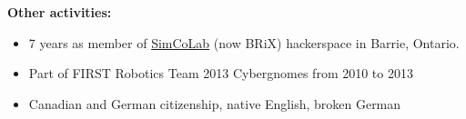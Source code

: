 \documentclass[fleqn,11pt]{article}
\newcommand{\itemoptions}{\setlength{\itemindent}{-10pt} \setlength\itemsep{-1em}}
\begin{document}


%
\begin{tcolorbox}
	\textbf{Other activities:\\}
	\begin{itemize}\itemoptions
	\item 7 years as member of \href{https://www.facebook.com/simcolab/}{SimCoLab} (now BRiX) hackerspace in Barrie, Ontario. \\
	\item Part of FIRST Robotics Team 2013 Cybergnomes from 2010 to 2013\\
	\item Canadian and German citizenship, native English, broken German\\
	\end{itemize}
\end{tcolorbox}
%






%
%	
\end{document}
